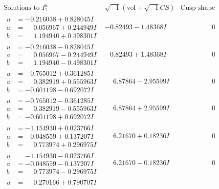 \documentclass[1p]{elsarticle_modified}
\theoremstyle{definition}
\newcommand{\I}{\sqrt{-1}}
\begin{document}
$$\begin{array}{c|c|c}
\text{Solutions to }I^u_{1}& \I (\text{vol} + \sqrt{-1}CS) & \text{Cusp shape}\\
 \hline 
\begin{aligned}
u &= -0.216038 + 0.828045 I \\
a &= \phantom{-}0.056967 + 0.244949 I \\
b &= \phantom{-}1.194940 + 0.498301 I\end{aligned}
 & -0.82493 - 1.48368 I & \phantom{-0.000000 } 0 \\ \hline\begin{aligned}
u &= -0.216038 - 0.828045 I \\
a &= \phantom{-}0.056967 - 0.244949 I \\
b &= \phantom{-}1.194940 - 0.498301 I\end{aligned}
 & -0.82493 + 1.48368 I & \phantom{-0.000000 } 0 \\ \hline\begin{aligned}
u &= -0.765012 + 0.361285 I \\
a &= \phantom{-}0.382919 + 0.555963 I \\
b &= -0.601198 - 0.692072 I\end{aligned}
 & \phantom{-}6.87864 - 2.95599 I & \phantom{-0.000000 } 0 \\ \hline\begin{aligned}
u &= -0.765012 - 0.361285 I \\
a &= \phantom{-}0.382919 - 0.555963 I \\
b &= -0.601198 + 0.692072 I\end{aligned}
 & \phantom{-}6.87864 + 2.95599 I & \phantom{-0.000000 } 0 \\ \hline\begin{aligned}
u &= -1.154930 + 0.023766 I \\
a &= -0.048559 + 0.137207 I \\
b &= \phantom{-}0.773974 + 0.296975 I\end{aligned}
 & \phantom{-}6.21670 + 0.18236 I & \phantom{-0.000000 } 0 \\ \hline\begin{aligned}
u &= -1.154930 - 0.023766 I \\
a &= -0.048559 - 0.137207 I \\
b &= \phantom{-}0.773974 - 0.296975 I\end{aligned}
 & \phantom{-}6.21670 - 0.18236 I & \phantom{-0.000000 } 0 \\ \hline\begin{aligned}
u &= \phantom{-}0.270166 + 0.790707 I \\

\end{aligned}
\end{array}$$
\end{document}
